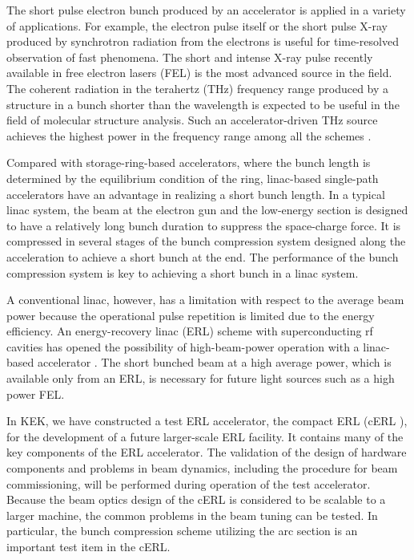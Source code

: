 \documentclass[review]{elsarticle}
\begin{document}
The short pulse electron bunch produced by an accelerator
is applied in a variety of applications.
For example,
the electron pulse itself \cite{UedYang}
or 
the short pulse X-ray produced by synchrotron radiation from the electrons
is useful for time-resolved observation of fast phenomena.
The short and intense X-ray pulse
recently available in free electron lasers (FEL) \cite{Lcls}\cite{Sacla}
is the most advanced source in the field.
The coherent radiation in the terahertz (THz) frequency range
produced by a structure in a bunch shorter than the wavelength 
is expected to be useful in the field of molecular structure analysis.
Such an accelerator-driven THz source
achieves the highest power in the frequency range 
among all the schemes \cite{jlabcsr}\cite{FlashCTRterahertzsource}.


Compared with storage-ring-based accelerators,
where the bunch length is determined by the equilibrium condition of the ring,
linac-based single-path accelerators have an advantage in realizing a short bunch length.
In a typical linac system,
the beam at the electron gun and the low-energy section
is designed to have a relatively long bunch duration to suppress the space-charge force.
It is compressed in several stages of the bunch compression system
designed along the acceleration to achieve a short bunch at the end.
The performance of the bunch compression system 
is key to achieving a short bunch in a linac system.


A conventional linac,
however, has a limitation with respect to the average beam power
because the operational pulse repetition is limited due to the energy efficiency.
An energy-recovery linac (ERL) scheme with superconducting rf cavities
has opened the possibility of high-beam-power operation
with a linac-based accelerator \cite{erlreview}. 
The short bunched beam at a high average power,
which is available only from an ERL, is necessary
for future light sources such as a high power FEL.



In KEK,
we have constructed a test ERL accelerator, the compact ERL (cERL \cite{Sakanakun}),
for the development of a future larger-scale ERL facility.
It contains many of the key components of the ERL accelerator.
The validation of the design of hardware components and problems in beam dynamics,
including the procedure for beam commissioning,
will be performed during operation of the test accelerator.
Because the beam optics design of the cERL
is considered to be scalable to a larger machine,
the common problems in the beam tuning can be tested.
In particular, the bunch compression scheme utilizing the arc section
is an important test item in the cERL.
\end{document}
